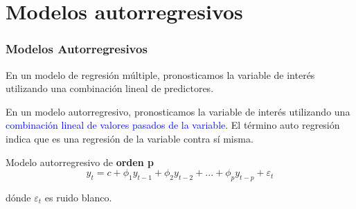 \documentclass[10pt]{beamer}
\begin{document}





\section{Modelos autorregresivos}



\begin{frame}[fragile]
\frametitle{Modelos Autorregresivos}


En un modelo de regresión múltiple, pronosticamos la variable de interés utilizando una combinación lineal de predictores. 

\vspace{4mm}

En un modelo autorregresivo, pronosticamos la variable de interés utilizando una \textcolor{blue}{combinación lineal de valores pasados de la variable}. El término auto regresión indica que es una regresión de la variable contra sí misma.

\vspace{4mm}

\begin{block}{Modelo autorregresivo de  \textbf{orden p}}
\begin{equation}
 y_{t}  =  c  +  \phi_{1}y_{t - 1}  +  \phi_{2}y_{t - 2}  +  ...  +  \phi_{p}y_{t - p}  + \varepsilon_{t}
\end{equation}

dónde $\varepsilon_t$ es ruido blanco.

\end{block}

\begin{center}
\end{center}


\end{frame}


\end{document}
